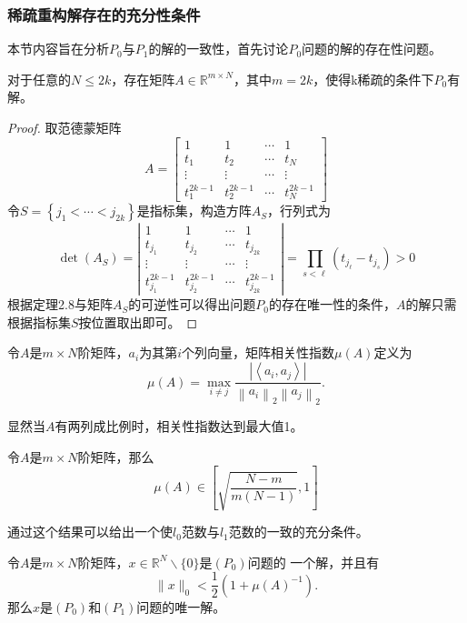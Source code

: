 \subsubsection{稀疏重构解存在的充分性条件}
本节内容旨在分析$P_0$与$P_1$的解的一致性，首先讨论$P_0$问题的解的存在性问题。
\begin{theorem}
    对于任意的$N \le 2k$，存在矩阵$A\in \mathbb{R}^{m \times N}$，其中$m=2k$，使得k稀疏的条件下$P_0$有解。
\end{theorem}
\begin{proof}
    取范德蒙矩阵
    \begin{equation}
        A=\left[\begin{array}{cccc}
        1 & 1 & \cdots & 1 \\
        t_1 & t_2 & \cdots & t_N \\
        \vdots & \vdots & \cdots & \vdots \\
        t_1^{2 k-1} & t_2^{2 k-1} & \cdots & t_N^{2 k-1}
        \end{array}\right]
    \end{equation}
    令$S=\left\{j_1<\cdots<j_{2 k}\right\}$是指标集，构造方阵$A_S$，行列式为
    \begin{equation}
        \operatorname{det}\left(A_S\right)=\left|\begin{array}{cccc}
        1 & 1 & \cdots & 1 \\
        t_{j_1} & t_{j_2} & \cdots & t_{j_{2 k}} \\
        \vdots & \vdots & \cdots & \vdots \\
        t_{j_1}^{2 k-1} & t_{j_2}^{2 k-1} & \cdots & t_{j_{2 k}}^{2 k-1}
        \end{array}\right|=\prod_{s<\ell}\left(t_{j_{\ell}}-t_{j_s}\right)>0
    \end{equation}
    根据定理2.8与矩阵$A_S$的可逆性可以得出问题$P_0$的存在唯一性的条件，$A$的解只需根据指标集$S$按位置取出即可。
\end{proof}


\begin{definition}
    令$A$是$m\times N$阶矩阵，$a_i$为其第$i$个列向量，矩阵相关性指数$\mu (A)$定义为
    \begin{equation}
        \mu(A)=\max _{i \neq j} \frac{\left|\left\langle a_i,a_j\right\rangle\right|}{\left\|a_i\right\|_2\left\|a_j\right\|_2} .
    \end{equation}
\end{definition}
显然当$A$有两列成比例时，相关性指数达到最大值1。
\begin{lemma}
    令$A$是$m\times N$阶矩阵，那么
    \begin{equation}
        \mu(A) \in\left[\sqrt{\frac{N-m}{m(N-1)}},1\right]
    \end{equation}
\end{lemma}
通过这个结果可以给出一个使$l_0$范数与$l_1$范数的一致的充分条件。
\begin{theorem}
    令$A$是$m\times N$阶矩阵，$x \in \mathbb{R}^N \backslash\{0\}$是$(P_0)$问题的
    一个解，并且有
    \begin{equation}
        \|x\|_0<\frac{1}{2}\left(1+\mu(A)^{-1}\right) .
    \end{equation}
    那么$x$是$(P_0)$和$(P_1)$问题的唯一解。
\end{theorem}

